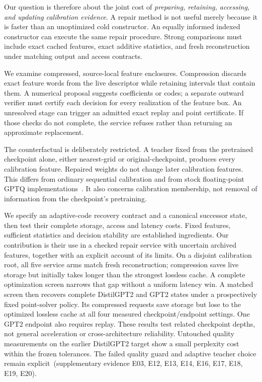 \documentclass[11pt]{article}
\renewcommand\cite{\citep}  %
\newcommand{\evidence}[1]{(supplementary evidence #1)}
\begin{document}
Our question is therefore about the joint cost of \emph{preparing, retaining,
accessing, and updating calibration evidence}. A repair method is not useful
merely because it is faster than an unoptimized cold constructor. An equally
informed indexed constructor can execute the same repair procedure. Strong
comparisons must include exact cached features, exact additive statistics, and
fresh reconstruction under matching output and access contracts.

We examine compressed, source-local feature enclosures. Compression discards
exact feature words from the live descriptor while retaining intervals that
contain them. A numerical proposal suggests coefficients or codes; a separate
outward verifier must certify each decision for every realization of the feature
box. An unresolved stage can trigger an admitted exact replay and point
certificate. If those checks do not complete, the service refuses rather than
returning an approximate replacement.

The counterfactual is deliberately restricted. A teacher fixed from the pretrained
checkpoint alone, either nearest-grid or original-checkpoint, produces every
calibration feature. Repaired weights do not change later calibration features. This differs
from ordinary sequential calibration and from stock floating-point GPTQ
implementations~\cite{gptq}. It also concerns calibration membership, not removal
of information from the checkpoint's pretraining.

We specify an adaptive-code recovery contract and a canonical successor state,
then test their complete storage, access and latency costs. Fixed features,
sufficient statistics and decision stability are established ingredients. Our
contribution is their use in a checked repair service with uncertain archived
features, together with an explicit account of its limits. On a disjoint
calibration root, all five service arms match fresh reconstruction; compression
saves live storage but initially takes longer than the strongest lossless cache.
A complete optimization screen narrows that gap without a uniform latency win.
A matched screen then recovers complete DistilGPT2 and GPT2 states under a
prospectively fixed point-solver policy. Its compressed requests save storage but
lose to the optimized lossless cache at all four measured checkpoint/endpoint
settings. One GPT2 endpoint also requires replay. These results test related
checkpoint depths, not general acceleration or cross-architecture reliability.
Untouched quality measurements on the earlier DistilGPT2 target show a small
perplexity cost within the frozen tolerances. The failed quality guard and
adaptive teacher choice remain explicit~\evidence{E03, E12, E13, E14, E16, E17, E18, E19, E20}.
\end{document}
